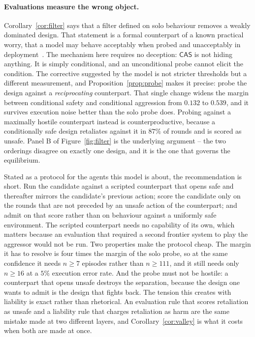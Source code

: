 \documentclass[pdflatex]{sn-jnl}
\theoremstyle{thmstyleone}
\theoremstyle{thmstylethree}
\theoremstyle{thmstyletwo}
\newcommand{\CAS}{\textsf{CAS}}
\begin{document}
\paragraph{Evaluations measure the wrong object.}
Corollary~\ref{cor:filter} says that a filter defined on solo behaviour
removes a weakly dominated design. That statement is a formal counterpart of a
known practical worry, that a model may behave acceptably when probed and
unacceptably in deployment~\citep{vanderweij2024sandbagging,hammond2025multiagent}. The mechanism here
requires no deception: $\CAS$ is not hiding anything. It is simply
conditional, and an unconditional probe cannot elicit the condition. The
corrective suggested by the model is not stricter thresholds but a different
measurement, and Proposition~\ref{prop:probe} makes it precise: probe the
design against a \emph{reciprocating} counterpart. That single change widens
the margin between conditional safety and conditional aggression from $0.132$
to $0.539$, and it survives execution noise better than the solo probe does.
Probing against a maximally hostile counterpart instead is
counterproductive, because a conditionally safe design retaliates against it
in $87\%$ of rounds and is scored as unsafe. Panel B of
Figure~\ref{fig:filter} is the underlying argument -- the two orderings
disagree on exactly one design, and it is the one that governs the
equilibrium.

Stated as a protocol for the agents this model is about, the recommendation is
short. Run the candidate against a scripted counterpart that opens safe and
thereafter mirrors the candidate's previous action; score the candidate only
on the rounds that are not preceded by an unsafe action of the counterpart;
and admit on that score rather than on behaviour against a uniformly safe
environment. The scripted counterpart needs no capability of its own, which
matters because an evaluation that required a second frontier system to play
the aggressor would not be run. Two properties make the protocol cheap. The
margin it has to resolve is four times the margin of the solo probe, so at the
same confidence it needs $n\ge7$ episodes rather than $n\ge111$, and it still
needs only $n\ge16$ at a $5\%$ execution error rate. And the probe must not be
hostile: a counterpart that opens unsafe destroys the separation, because the
design one wants to admit is the design that fights back. The tension this
creates with liability is exact rather than rhetorical. An evaluation rule that
scores retaliation as unsafe and a liability rule that charges retaliation as
harm are the same mistake made at two different layers, and
Corollary~\ref{cor:valley} is what it costs when both are made at once.
\end{document}
